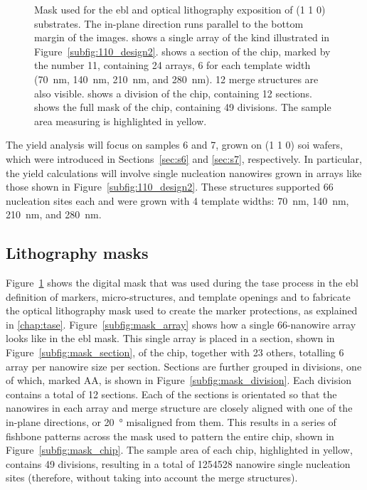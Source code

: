 \begin{figure}
{    }
    \caption[Mask used for the \acs{ebl} and optical lithography exposition of \hkl(1 1 0) substrtates.]{Mask used for the \acs{ebl} and optical lithography exposition of \hkl(1 1 0) substrates. The in-plane  direction runs parallel to the bottom margin of the images.  shows a single array of the kind illustrated in Figure~\ref{subfig:110_design2}.  shows a section of the chip, marked by the number 11, containing \num{24} arrays, \num{6} for each template width (\qty{70}{nm}, \qty{140}{nm}, \qty{210}{nm}, and \qty{280}{nm}). \num{12} merge structures are also visible.  shows a division of the chip, containing \num{12} sections.  shows the full mask of the chip, containing \num{49} divisions. The sample area measuring  is highlighted in yellow.}
    \label{fig:wafer_mask}
\end{figure}

The yield analysis will focus on samples \num{6} and \num{7}, grown on \hkl(1 1 0) \acs{soi} wafers, which were introduced in Sections~\ref{sec:s6} and \ref{sec:s7}, respectively. In particular, the yield calculations will involve single nucleation nanowires grown in arrays like those shown in Figure~\ref{subfig:110_design2}. These structures supported \num{66} nucleation sites each and were grown with 4 template widths: \qty{70}{nm}, \qty{140}{nm}, \qty{210}{nm}, and \qty{280}{nm}.

\subsection{Lithography masks}

Figure~\ref{fig:wafer_mask} shows the digital mask that was used during the \acs{tase} process in the \acf{ebl} definition of markers, micro-structures, and template openings and to fabricate the optical lithography mask used to create the marker protections, as explained in \ref{chap:tase}. Figure~\ref{subfig:mask_array} shows how a single \num{66}-nanowire array looks like in the \acs{ebl} mask. This single array is placed in a section, shown in Figure~\ref{subfig:mask_section}, of the chip, together with \num{23} others, totalling \num{6} array per nanowire size per section. Sections are further grouped in divisions, one of which, marked AA, is shown in Figure~\ref{subfig:mask_division}. Each division contains a total of \num{12} sections. Each of the sections is orientated so that the nanowires in each array and merge structure are closely aligned with one of the in-plane  directions, or \qty{20}{\degree} misaligned from them. This results in a series of fishbone patterns across the mask used to pattern the entire chip, shown in Figure~\ref{subfig:mask_chip}. The  sample area of each chip, highlighted in yellow, contains \num{49} divisions, resulting in a total of \num{1254528} nanowire single nucleation sites (therefore, without taking into account the merge structures). 

